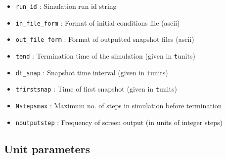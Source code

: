 \documentclass[a4paper]{article}
\newcommand{\var}[1]{\texttt{#1}}
\begin{document}
\begin{itemize}
\item \var{run\_id}  : Simulation run id string

\item \var{in\_file\_form} : Format of initial conditions file
                      (ascii)

\item \var{out\_file\_form} : Format of outputted snapshot files
                      (ascii)

\item \var{tend} : Termination time of the simulation (given in {\var tunit}s)

\item \var{dt\_snap} : Snapshot time interval (given in {\var tunit}s)

\item \var{tfirstsnap} : Time of first snapshot (given in {\var tunit}s)

\item \var{Nstepsmax} : Maximum no. of steps in simulation before termination

\item \var{noutputstep} : Frequency of screen output (in units of integer steps)


\end{itemize}



\subsection{Unit parameters}
\end{document}
